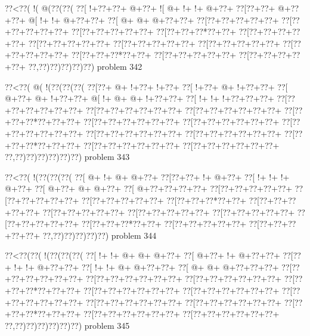\vbox{\vbox{\goo
\0??<\0??(\- !(\- @(\0??(\0??(
\0??[\- !+\0??+\0??+\- @+\0??+
\- ![\- @+\- !+\- !+\- @+\0??+
\0??[\0??+\0??+\- @+\0??+\0??+
\- @[\- !+\- !+\- @+\0??+\0??+
\0??[\- @+\- @+\- @+\0??+\0??+
\0??[\0??+\0??+\0??+\0??+\0??+
\0??[\0??+\0??+\0??+\0??+\0??+
\0??[\0??+\0??+\0??+\0??+\0??+
\0??[\0??+\0??+\0??*\0??+\0??+
\0??[\0??+\0??+\0??+\0??+\0??+
\0??[\0??+\0??+\0??+\0??+\0??+
\0??[\0??+\0??+\0??+\0??+\0??+
\0??[\0??+\0??+\0??+\0??+\0??+
\0??[\0??+\0??+\0??+\0??+\0??+
\0??[\0??+\0??+\0??*\0??+\0??+
\0??[\0??+\0??+\0??+\0??+\0??+
\0??[\0??+\0??+\0??+\0??+\0??+
\0??,\0??)\0??)\0??)\0??)\0??)
}
\hfil problem 342\hfil\break
}

\vbox{\vbox{\goo
\0??<\0??(\- @(\- !(\0??(\0??(\0??(
\0??[\0??+\- @+\- !+\0??+\- !+\0??+
\0??[\- !+\0??+\- @+\- !+\0??+\0??+
\0??[\- @+\0??+\- @+\- !+\0??+\0??+
\- @[\- !+\- @+\- @+\- !+\0??+\0??+
\0??[\- !+\- !+\- !+\0??+\0??+\0??+
\0??[\0??+\0??+\0??+\0??+\0??+\0??+
\0??[\0??+\0??+\0??+\0??+\0??+\0??+
\0??[\0??+\0??+\0??+\0??+\0??+\0??+
\0??[\0??+\0??+\0??*\0??+\0??+\0??+
\0??[\0??+\0??+\0??+\0??+\0??+\0??+
\0??[\0??+\0??+\0??+\0??+\0??+\0??+
\0??[\0??+\0??+\0??+\0??+\0??+\0??+
\0??[\0??+\0??+\0??+\0??+\0??+\0??+
\0??[\0??+\0??+\0??+\0??+\0??+\0??+
\0??[\0??+\0??+\0??*\0??+\0??+\0??+
\0??[\0??+\0??+\0??+\0??+\0??+\0??+
\0??[\0??+\0??+\0??+\0??+\0??+\0??+
\0??,\0??)\0??)\0??)\0??)\0??)\0??)
}
\hfil problem 343\hfil\break
}

\vbox{\vbox{\goo
\0??<\0??(\- !(\0??(\0??(\0??(
\0??[\- @+\- !+\- @+\- @+\0??+
\0??[\0??+\0??+\- !+\- @+\0??+
\0??[\- !+\- !+\- !+\- @+\0??+
\0??[\- @+\0??+\- @+\- @+\0??+
\0??[\- @+\0??+\0??+\0??+\0??+
\0??[\0??+\0??+\0??+\0??+\0??+
\0??[\0??+\0??+\0??+\0??+\0??+
\0??[\0??+\0??+\0??+\0??+\0??+
\0??[\0??+\0??+\0??*\0??+\0??+
\0??[\0??+\0??+\0??+\0??+\0??+
\0??[\0??+\0??+\0??+\0??+\0??+
\0??[\0??+\0??+\0??+\0??+\0??+
\0??[\0??+\0??+\0??+\0??+\0??+
\0??[\0??+\0??+\0??+\0??+\0??+
\0??[\0??+\0??+\0??*\0??+\0??+
\0??[\0??+\0??+\0??+\0??+\0??+
\0??[\0??+\0??+\0??+\0??+\0??+
\0??,\0??)\0??)\0??)\0??)\0??)
}
\hfil problem 344\hfil\break
}

\vbox{\vbox{\goo
\0??<\0??(\0??(\- !(\0??(\0??(\0??(
\0??[\- !+\- !+\- @+\- @+\- @+\0??+
\0??[\- @+\0??+\- !+\- @+\0??+\0??+
\0??[\0??+\- !+\- !+\- @+\0??+\0??+
\0??[\- !+\- !+\- @+\- @+\0??+\0??+
\0??[\- @+\- @+\- @+\0??+\0??+\0??+
\0??[\0??+\0??+\0??+\0??+\0??+\0??+
\0??[\0??+\0??+\0??+\0??+\0??+\0??+
\0??[\0??+\0??+\0??+\0??+\0??+\0??+
\0??[\0??+\0??+\0??*\0??+\0??+\0??+
\0??[\0??+\0??+\0??+\0??+\0??+\0??+
\0??[\0??+\0??+\0??+\0??+\0??+\0??+
\0??[\0??+\0??+\0??+\0??+\0??+\0??+
\0??[\0??+\0??+\0??+\0??+\0??+\0??+
\0??[\0??+\0??+\0??+\0??+\0??+\0??+
\0??[\0??+\0??+\0??*\0??+\0??+\0??+
\0??[\0??+\0??+\0??+\0??+\0??+\0??+
\0??[\0??+\0??+\0??+\0??+\0??+\0??+
\0??,\0??)\0??)\0??)\0??)\0??)\0??)
}
\hfil problem 345\hfil\break
}

